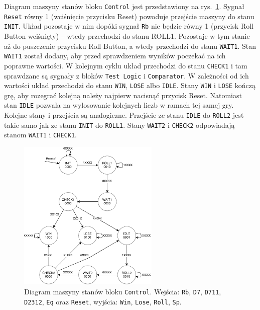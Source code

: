 \documentclass[a4paper,11pt,fleqn]{article}
\begin{document}
Diagram maszyny stanów bloku \texttt{Control} jest przedstawiony na rys.~\ref{diceGameDiagram}. Sygnał \texttt{Reset} równy 1 (wciśnięcie przycisku Reset) powoduje przejście maszyny do stanu \texttt{INIT}. Układ pozostaje w nim dopóki sygnał \texttt{Rb} nie będzie równy 1 (przycisk Roll Button wciśnięty) -- wtedy przechodzi do stanu ROLL1. Pozostaje w tym stanie aż do puszczenie przycisku Roll Button, a wtedy przechodzi do stanu \texttt{WAIT1}. Stan \texttt{WAIT1} został dodany, aby przed sprawdzeniem wyników poczekać na ich poprawne wartości. W kolejnym cyklu układ przechodzi do stanu \texttt{CHECK1} i tam sprawdzane są sygnały z bloków \texttt{Test Logic} i \texttt{Comparator}. W zależności od ich wartości układ przechodzi do stanu \texttt{WIN}, \texttt{LOSE} albo \texttt{IDLE}. Stany \texttt{WIN} i \texttt{LOSE} kończą grę, aby rozegrać kolejną należy najpierw nacisnąć przycisk Reset. Natomiast stan \texttt{IDLE} pozwala na wylosowanie kolejnych liczb w ramach tej samej gry. Kolejne stany i przejścia są analogiczne. Przejście ze stanu \texttt{IDLE} do \texttt{ROLL2} jest takie samo jak ze stanu \texttt{INIT} do \texttt{ROLL1}. Stany \texttt{WAIT2} i \texttt{CHECK2} odpowiadają stanom \texttt{WAIT1} i \texttt{CHECK1}.


\begin{figure}[h]
\centering
\includegraphics[width=0.6\textwidth]{diagrams/diceGameDiagram.pdf}
\caption{Diagram maszyny stanów bloku \texttt{Control}. Wejścia: \texttt{Rb}, \texttt{D7}, \texttt{D711}, \texttt{D2312}, \texttt{Eq} oraz \texttt{Reset}, wyjścia: \texttt{Win}, \texttt{Lose}, \texttt{Roll}, \texttt{Sp}.}
\label{diceGameDiagram}
\end{figure}
\end{document}
